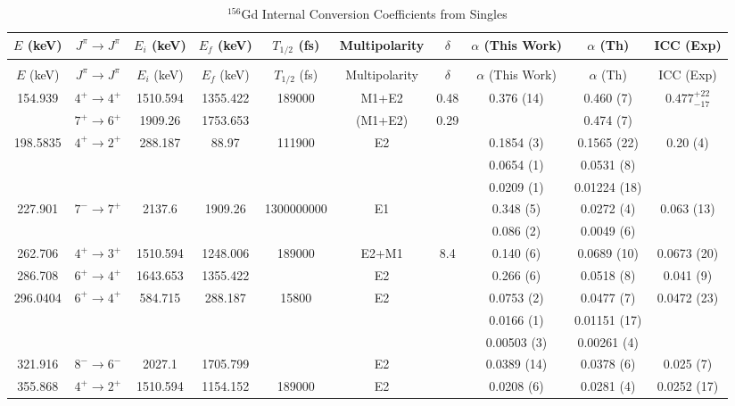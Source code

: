 \begin{landscape}
    \begin{longtable}{c|c|c|c|c|c|c|c|c|c}
    \caption{$^{156}$Gd Internal Conversion Coefficients from Singles}
        \label{tab:156Gd_Single_ICC_Corr}\\
    \toprule
$E$ (keV)	&	$J^{\pi}	\rightarrow	J^{\pi}$	&	$E_i$ (keV)	&	$E_f$ (keV)	&	$T_{1/2}$ (fs)	&	Multipolarity	&	$\delta$	&	$\alpha$ (This Work)	&	$\alpha$  (Th)	&	ICC (Exp)	\\
\hline		
\endfirsthead
    \caption[]{$^{156}$Gd Internal Conversion Coefficients from Singles}\\
    \toprule
$E$ (keV)	&	$J^{\pi}	\rightarrow	J^{\pi}$	&	$E_i$ (keV)	&	$E_f$ (keV)	&	$T_{1/2}$ (fs)	&	Multipolarity	&	$\delta$	&	$\alpha$ (This Work)	&	$\alpha$  (Th)	&	ICC (Exp)	\\
\hline		
\endhead
154.939	&	$4^+	\rightarrow	4^+$	&	1510.594	&	1355.422	&	189000	&	M1+E2	&	0.48	&	0.376 (14)	&	0.460 (7)	&	$0.477_{-17}^{+22}$	\\
	&	$7^+	\rightarrow	6^+$	&	1909.26	&	1753.653	&		&	(M1+E2)	&	0.29	&		&	0.474 (7)	&		\\
198.5835	&	$4^+	\rightarrow	2^+$	&	288.187	&	88.97	&	111900	&	E2	&		&	0.1854 (3)	&	0.1565 (22)	&	0.20 (4)	\\
	&				&		&		&		&		&		&	0.0654 (1)	&	0.0531 (8)	&		\\
	&			&		&		&		&		&		&	0.0209 (1)	&	0.01224 (18)	&		\\
227.901	&	$7^-	\rightarrow 7^+$	&	2137.6	&	1909.26	&	1300000000	&	E1	&		&	0.348 (5)	&	0.0272 (4)	&	0.063 (13)	\\
	&			&		&		&		&		&		&	0.086 (2)	&	0.0049 (6)	&		\\
262.706	&	$4^+	\rightarrow	3^+$	&	1510.594	&	1248.006	&	189000	&	E2+M1	&	8.4	&	0.140 (6)	&	0.0689 (10)	&	0.0673 (20)	\\
286.708	&	$6^+	\rightarrow	4^+$	&	1643.653	&	1355.422	&		&	E2	&		&	0.266 (6)	&	0.0518 (8)	&	0.041 (9)	\\
296.0404	&	$6^+	\rightarrow	4^+$	&	584.715	&	288.187	&	15800	&	E2	&		&	0.0753 (2)	&	0.0477 (7)	&	0.0472 (23)	\\
	&				&		&		&		&		&		&	0.0166 (1)	&	0.01151 (17)	&		\\
	&				&		&		&		&		&		&	0.00503 (3)	&	0.00261 (4)	&		\\
321.916	&	$8^-	\rightarrow	6^-$	&	2027.1	&	1705.799	&		&	E2	&		&	0.0389 (14)	&	0.0378 (6)	&	0.025 (7)	\\
355.868	&	$4^+	\rightarrow	2^+$	&	1510.594	&	1154.152	&	189000	&	E2	&		&	0.0208 (6)	&	0.0281 (4)	&	0.0252 (17)	\\

\end{longtable}
\end{landscape}
